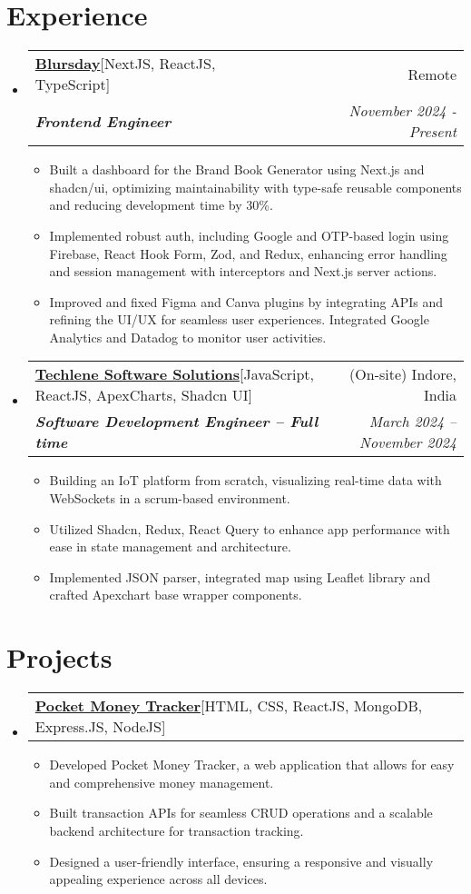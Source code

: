 \documentclass[letterpaper,11pt]{article}
\makeatletter
\newcommand{\resumeItem}[1]{
    \item\small{
      {#1 \vspace{-2pt}}
    }
  }
\newcommand{\resumeSubheading}[4]{
    \vspace{-2pt}\item
      \begin{tabular*}{0.97\textwidth}[t]{l@{\extracolsep{\fill}}r}
        {#1} & #2 \\
        \textit{\small#3} & \textit{\small #4}\\
      \end{tabular*}\vspace{-7pt}
  }
\newcommand{\resumeProjectHeading}[2]{
      \item
      \begin{tabular*}{0.97\textwidth}{l@{\extracolsep{\fill}}r}
        \small#1 & #2 \\
      \end{tabular*}\vspace{-7pt}
  }
\newcommand{\resumeSubHeadingListStart}{\begin{itemize}[leftmargin=0.15in, label={}]}
\newcommand{\resumeSubHeadingListEnd}{\end{itemize}}
\newcommand{\resumeItemListStart}{\begin{itemize}}
\newcommand{\resumeItemListEnd}{\end{itemize}\vspace{-5pt}}
\makeatother
\begin{document}

\section{Experience}

\resumeSubHeadingListStart
\resumeSubheading
{\textbf{\href{https://www.blursday.ai/}{Blursday}\hspace{5pt}}{{[NextJS, ReactJS, TypeScript]}}}{Remote}
{\textbf{Frontend Engineer}}{November 2024 - Present }
\resumeItemListStart
\resumeItem{Built a dashboard for the Brand Book Generator using Next.js and shadcn/ui, optimizing maintainability with type-safe reusable components and reducing development time by 30\%.
}
\resumeItem{Implemented robust auth, including Google and OTP-based login using Firebase, React Hook Form, Zod, and Redux, enhancing error handling and session management with interceptors and Next.js server actions.
}
\resumeItem{Improved and fixed Figma and Canva plugins by integrating APIs and refining the UI/UX for seamless user experiences. Integrated Google Analytics and Datadog to monitor user activities.}
\resumeItemListEnd
\resumeSubHeadingListEnd

\resumeSubHeadingListStart
\resumeSubheading
{\textbf{\href{https://www.techlene.com/}{Techlene Software Solutions}\hspace{5pt}}{{[JavaScript, ReactJS, ApexCharts, Shadcn UI]}}}{(On-site) Indore, India}
{\textbf{Software Development Engineer – Full time}}{March 2024 -- November 2024}
\resumeItemListStart
\resumeItem{Building an IoT platform from scratch, visualizing real-time data with WebSockets in a scrum-based environment.}
\resumeItem{Utilized Shadcn, Redux, React Query to enhance app performance with ease in state management and architecture.}
\resumeItem{Implemented JSON parser, integrated map using Leaflet library and crafted Apexchart base wrapper components.}
\resumeItemListEnd
\resumeSubHeadingListEnd






\section{Projects}

\resumeSubHeadingListStart
\resumeProjectHeading
{\textbf{\href{https://github.com/shanutiwari1010/money-tracker-app}{Pocket Money Tracker}\hspace{5pt}}{[HTML, CSS, ReactJS, MongoDB, Express.JS, NodeJS]}}{}
\resumeItemListStart
\resumeItem{Developed Pocket Money Tracker, a web application that allows for easy and comprehensive money management.}
\resumeItem{Built transaction APIs for seamless CRUD operations and a scalable backend architecture for transaction tracking.}
\resumeItem{Designed a user-friendly interface, ensuring a responsive and visually appealing experience across all devices.}
\resumeItemListEnd
\resumeSubHeadingListEnd
\end{document}
